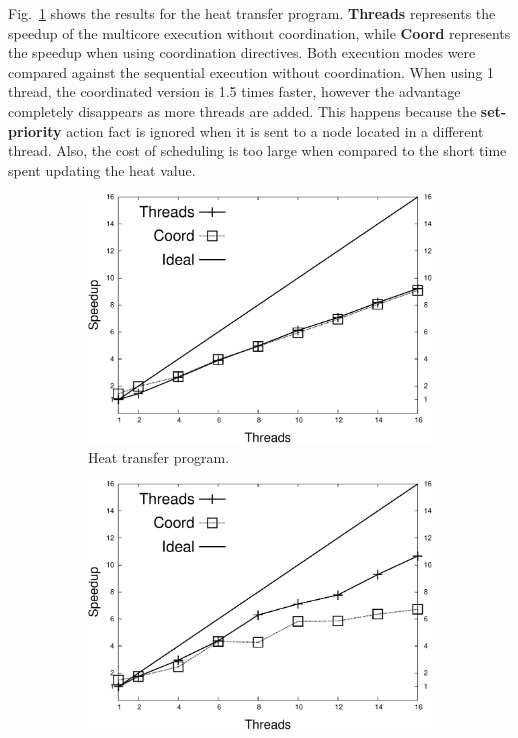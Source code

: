 Fig.~\ref{exp:heat-transfer} shows the results for the heat transfer program. \textbf{Threads} represents the speedup of the multicore execution
without coordination, while \textbf{Coord} represents the speedup when using coordination directives.
Both execution modes were compared against the sequential execution without coordination.
When using 1 thread, the coordinated version is 1.5 times
faster, however the advantage completely disappears as more threads are added. This happens because the \textbf{set-priority} action fact is ignored
when it is sent to a node located in a different thread. Also, the cost of scheduling is too large when compared to the short time spent
updating the heat value.

\begin{figure}[h!]
     \centering
   \begin{subfigure}[b]{0.4\textwidth}
      \includegraphics[width=\textwidth]{new-benchmarks/speedup_new-heat-transfer-80.pdf}
      \caption{Heat transfer program.}\label{exp:heat-transfer}
   \end{subfigure}
   \begin{subfigure}[b]{0.4\textwidth}
      \includegraphics[width=\textwidth]{new-benchmarks/speedup_shortest-uspowergrid.pdf}

\end{subfigure}
\end{figure}
